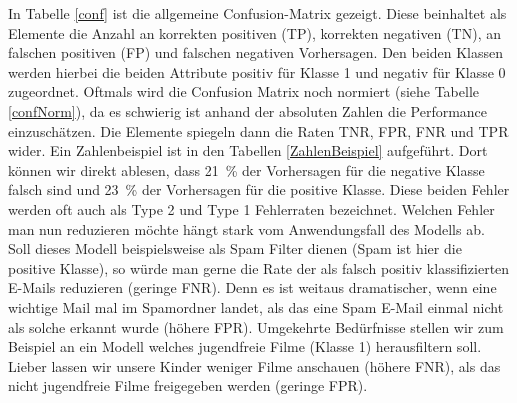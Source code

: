 \documentclass[twoside=true, openright, pdftex, bibliography=totoc, chapterprefix=true, appendixprefix=true, numbers=noenddot, parskip=half, titlepage, index=totoc, headlines=3, footlines=2, headings=normal, language=german]{scrartcl}
\begin{document}
In Tabelle \ref{conf} ist die allgemeine Confusion-Matrix gezeigt. Diese beinhaltet als Elemente die Anzahl an korrekten positiven (TP), korrekten negativen (TN), an falschen positiven (FP) und falschen negativen Vorhersagen. Den beiden Klassen werden hierbei die beiden Attribute positiv für Klasse 1 und negativ für Klasse 0 zugeordnet. Oftmals wird die Confusion Matrix noch normiert (siehe Tabelle \ref{confNorm}), da es schwierig ist anhand der absoluten Zahlen die Performance einzuschätzen. Die Elemente spiegeln dann die Raten TNR, FPR, FNR und TPR wider. Ein Zahlenbeispiel ist in den Tabellen \ref{ZahlenBeispiel} aufgeführt. Dort können wir direkt ablesen, dass 21~\% der Vorhersagen für die negative Klasse falsch sind und 23~\% der Vorhersagen für die positive Klasse. Diese beiden Fehler werden oft auch als Type 2 und Type 1 Fehlerraten bezeichnet.  Welchen Fehler man nun reduzieren möchte hängt stark vom Anwendungsfall des Modells ab. Soll dieses Modell beispielsweise als Spam Filter dienen (Spam ist hier die positive Klasse), so würde man gerne die Rate der als falsch positiv klassifizierten E-Mails reduzieren (geringe FNR). Denn es ist weitaus dramatischer, wenn eine wichtige Mail mal im Spamordner landet, als das eine Spam E-Mail einmal nicht als solche erkannt wurde (höhere FPR). Umgekehrte Bedürfnisse stellen wir zum Beispiel an ein Modell welches jugendfreie Filme (Klasse 1) herausfiltern soll. Lieber lassen wir unsere Kinder weniger Filme anschauen (höhere FNR), als das nicht jugendfreie Filme freigegeben werden (geringe FPR).
\end{document}
